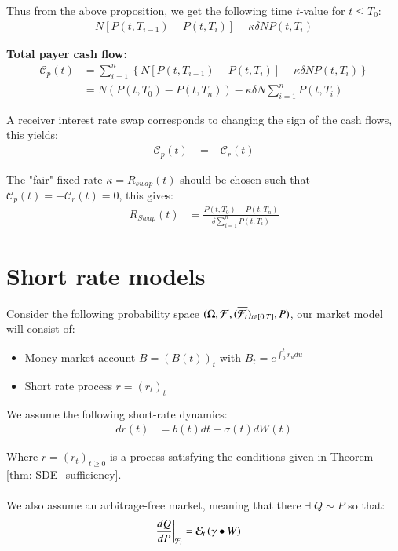 Thus from the above proposition, we get the following time $t$-value for $t\leq T_{0}$:
\begin{align*}
N[P(t,T_{i-1}) - P(t,T_{i})] - \kappa\delta N P(t,T_{i})   
\end{align*}

\textbf{Total payer cash flow:}
\begin{align*}
\mathcal{C}_{p}(t) &= \sum_{i=1}^{n}\left\{
 N[P(t,T_{i-1}) - P(t,T_{i})] - \kappa\delta N P(t,T_{i}) 
\right\}  \\
&= N(P(t,T_{0})-P(t,T_{n})) - \kappa\delta N\sum_{i=1}^{n}P(t,T_{i})
\end{align*} 

A receiver interest rate swap corresponds to changing the sign of the cash flows, this yields:
\begin{align*}
\mathcal{C}_{p}(t) &= -\mathcal{C}_{r}(t)    
\end{align*}

\begin{result}
The "fair" fixed rate $\kappa = R_{swap}(t)$ should be chosen such that $\mathcal{C}_{p}(t) = -\mathcal{C}_{r}(t) = 0$, this gives:
\begin{align*}
R_{Swap}(t) &= \frac{P(t,T_{0}) - P(t,T_{n})}{\delta \sum_{i=1}^{n}P(t,T_{i})}
\end{align*} 
\end{result}

\newpage

\section{Short rate models}
Consider the following probability space $(\Omega, \mathcal{F}, (\overline{\mathcal{F}_{t}})_{t \in [0,T]}, P)$, our market model will consist of:
\begin{itemize}
    \item Money market account $B = (B(t))_{t}$ with $B_{t} = e^{\int_{0}^{t}r_{u}du}$
    \item Short rate process $r = (r_{t})_{t}$
\end{itemize}

We assume the following short-rate dynamics:
\begin{align*}
dr(t) &= b(t)dt + \sigma(t)dW(t)   
\end{align*} 

Where $r = (r_{t})_{t\geq 0}$ is a process satisfying the conditions given in Theorem \ref{thm: SDE_sufficiency}. 
\\~\\
We also assume an arbitrage-free market, meaning that there $\exists \; Q\sim P$ so that: 
\begin{align*}
\frac{dQ}{dP}\bigg{|}_{\mathcal{F}_{t}} &= \mathcal{E}_{t}\left(
\gamma \bullet W
\right)    
\end{align*}

